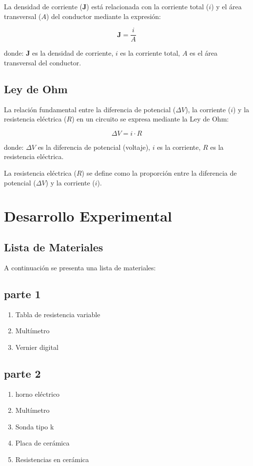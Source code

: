 \documentclass{article}
\begin{document}
\begin{multicols}{2}
La densidad de corriente ($\mathbf{J}$) está relacionada con la corriente total ($i$) y el área transversal ($A$) del conductor mediante la expresión:

\begin{equation}
    \mathbf{J} = \frac{i}{A}
\end{equation}

donde:
$\mathbf{J}$ es la densidad de corriente,
$i$ es la corriente total,
$A$ es el área transversal del conductor.

\subsection{Ley de Ohm}

La relación fundamental entre la diferencia de potencial ($\Delta V$), la corriente ($i$) y la resistencia eléctrica ($R$) en un circuito se expresa mediante la Ley de Ohm:

\begin{equation}
    \Delta V = i \cdot R
\end{equation}

donde:
$\Delta V$ es la diferencia de potencial (voltaje),
$i$ es la corriente,
$R$ es la resistencia eléctrica.

La resistencia eléctrica ($R$) se define como la proporción entre la diferencia de potencial ($\Delta V$) y la corriente ($i$).
\section{Desarrollo Experimental}\label{Desarrollo experimental}				%
\subsection*{Lista de Materiales}
A continuación se presenta una lista de materiales:
\subsection*{parte 1}
\begin{enumerate}
    \item Tabla de resistencia variable
    \item Multímetro
    \item Vernier digital
\end{enumerate}
\subsection*{parte 2}
\begin{enumerate}
    \item horno eléctrico
    \item Multímetro
    \item Sonda tipo k
    \item Placa de cerámica
    \item Resistencias en cerámica
\end{enumerate}


\end{multicols}
\end{document}
